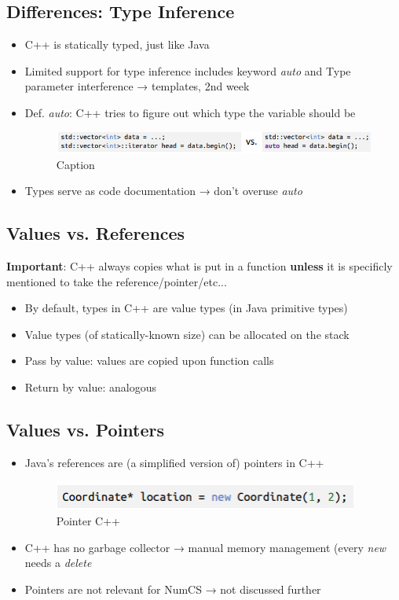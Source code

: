 \documentclass[a4paper,10pt]{article}
\begin{document}
\subsection{Differences: Type Inference}
\begin{itemize}
    \item C++ is statically typed, just like Java
    \item Limited support for type inference includes keyword \textit{auto} and Type parameter interference → templates, 2nd week
    \item Def. \textit{auto}: C++ tries to figure out which type the variable should be
    \begin{figure}[htp]
        \centering
        \includegraphics[width=15cm]{e2.png}
        \caption{Caption}
        \label{fig:enter-label}
    \end{figure}
    \item Types serve as code documentation → don’t overuse \textit{auto}
\end{itemize}
\subsection{Values vs. References}
\textbf{Important}: C++ always copies what is put in a function \textbf{unless} it is specificly mentioned to take the reference/pointer/etc...\\
\begin{itemize}
    \item By default, types in C++ are value types (in Java primitive types)
    \item Value types (of statically-known size) can be allocated on the stack
    \item Pass by value: values are copied upon function calls
    \item Return by value: analogous
\end{itemize}
\subsection{Values vs. Pointers}
\begin{itemize}
    \item Java’s references are (a simplified version of) pointers in C++
    \begin{figure}[htp]
        \centering
        \includegraphics[width=10cm]{e3.png}
        \caption{Pointer C++}
        \label{fig:enter-label}
    \end{figure}
    \item C++ has no garbage collector → manual memory management (every \textit{new} needs a \textit{delete}
    \item Pointers are not relevant for NumCS → not discussed further
\end{itemize}
\end{document}
